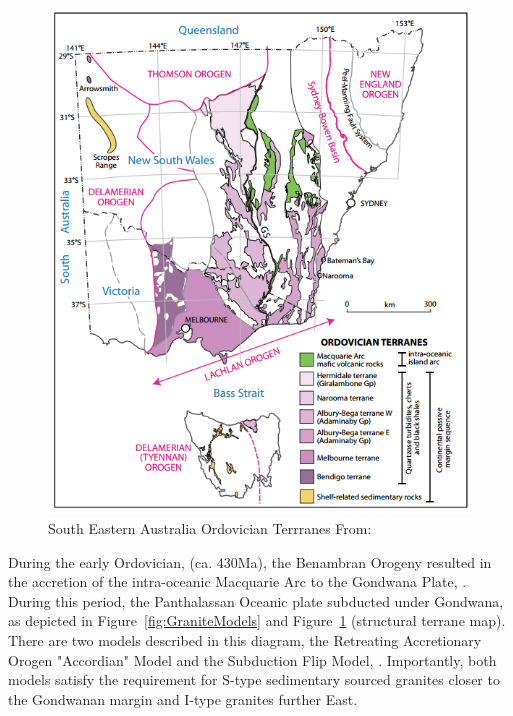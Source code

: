 \documentclass[a4paper]{article}
\begin{document}
\begin{figure}[H]
\centering
\includegraphics[width=1\textwidth]{SEAustraliaOrdovicianTerrannes.jpg}
\caption{\label{fig:SEAustraliaOrdovicianTerrannes}South Eastern Australia Ordovician Terrranes From: \cite{aitchison2012accordion}}
\end{figure}

During the early Ordovician, (ca. 430Ma), the Benambran Orogeny resulted in the accretion of the intra-oceanic Macquarie Arc to the Gondwana Plate, \cite{BenambranOrogeny}.  During this period, the Panthalassan Oceanic plate subducted under Gondwana, as depicted in Figure~\ref{fig:GraniteModels} and Figure~\ref{fig:SEAustraliaOrdovicianTerrannes} (structural  terrane map). There are two models described in this diagram, the Retreating Accretionary Orogen "Accordian" Model and the Subduction Flip Model, \cite{aitchison2012accordion}. Importantly, both models satisfy the requirement for S-type sedimentary sourced granites closer to the Gondwanan margin and I-type granites further East.
\end{document}
